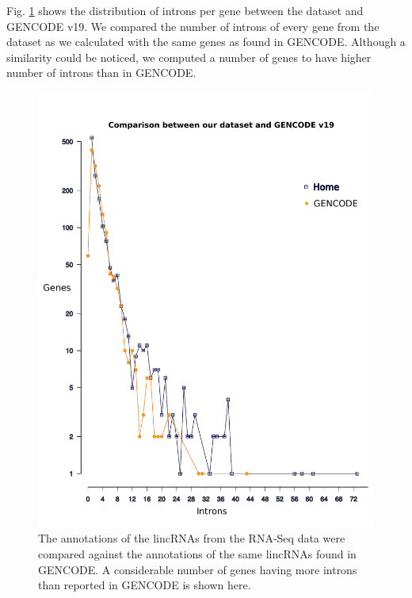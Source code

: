 \documentclass[ncrna,article,submit,moreauthors,pdftex,10pt,a4paper]{mdpi}
\begin{document}
Fig. \ref{comparison} shows the distribution of introns per gene between the dataset and GENCODE v19. We compared the number of introns of every gene from the dataset as we calculated with the same genes as found in GENCODE. Although a similarity could be noticed, we computed a number of genes to have higher number of introns than in GENCODE.
\begin{figure}[H]
 \centering
 \includegraphics[height = 12 cm, width=14 cm]{comparison_plot_2}
 \caption{The annotations of the lincRNAs from the RNA-Seq data were compared against the annotations of the same lincRNAs found in GENCODE. A considerable number of genes having more introns than reported in GENCODE is shown here.}
 \label{comparison}
\end{figure}
\end{document}
